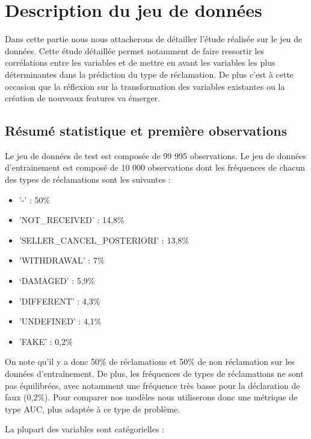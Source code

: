 
\chapter{Description du jeu de données}

Dans cette partie nous nous attacherons de détailler l'étude réalisée sur le jeu de données.
Cette étude détaillée permet notamment de faire ressortir les corrélations entre les variables
et de mettre en avant les variables les plus déterminantes dans la prédiction du type de 
réclamation. De plus c'est à cette occasion que la réflexion sur la transformation des variables
existantes ou la création de nouveaux features va émerger.

\section{Résumé statistique et première observations}

Le jeu de données de test est composée de 99 995 observations.
Le jeu de données d'entrainement est composé de 10 000 observations dont les fréquences 
de chacun des types de réclamations sont les suivantes :

\begin{itemize}
\item '-' : 50\% 
\item 'NOT_RECEIVED' : 14,8\%
\item 'SELLER_CANCEL_POSTERIORI' : 13,8\%
\item 'WITHDRAWAL' : 7\%
\item ‘DAMAGED' : 5,9\%
\item 'DIFFERENT' : 4,3\%
\item 'UNDEFINED' : 4,1\%
\item 'FAKE' : 0,2\%
\end{itemize}

On note qu'il y a donc 50\% de réclamations et 50\% de non réclamation sur les données 
d'entraînement. De plus, les fréquences de types de réclamations ne sont pas équilibrées,
avec notamment une fréquence très basse pour la déclaration de faux (0,2\%). Pour comparer
nos modèles nous utiliserons donc une métrique de type AUC, plus adaptée à ce type de 
problème. 

La plupart des variables sont catégorielles :

